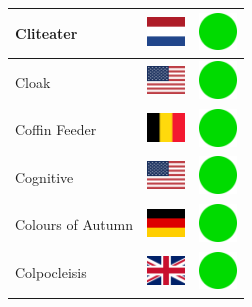 \documentclass[12pt, a4paper, twoside]{report}
\begin{document}
\begin{center}
\begin{longtable}{|p{5cm}|p{2cm}|p{2cm}|}
 Cliteater                                                  & \includegraphics[width=1cm]{../4x3/nl} &   \includegraphics[width=1cm]{../likes/y} \\ \hline
 Cloak                                                      & \includegraphics[width=1cm]{../4x3/us} &   \includegraphics[width=1cm]{../likes/y} \\ \hline
 Coffin Feeder                                              & \includegraphics[width=1cm]{../4x3/be} &   \includegraphics[width=1cm]{../likes/y} \\ \hline
 Cognitive                                                  & \includegraphics[width=1cm]{../4x3/us} &   \includegraphics[width=1cm]{../likes/y} \\ \hline
 Colours of Autumn                                          & \includegraphics[width=1cm]{../4x3/de} &   \includegraphics[width=1cm]{../likes/y} \\ \hline
 Colpocleisis                                               & \includegraphics[width=1cm]{../4x3/gb} &   \includegraphics[width=1cm]{../likes/y} \\ \hline

\end{longtable}
\end{center}
\end{document}
